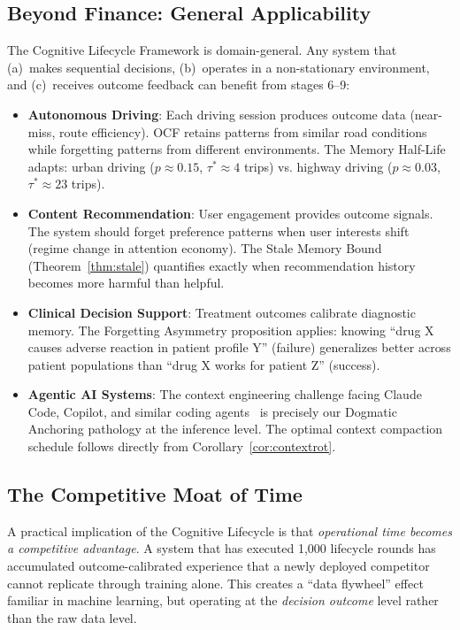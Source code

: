 \documentclass[11pt, a4paper]{article}
\begin{document}
\subsection{Beyond Finance: General Applicability}

The Cognitive Lifecycle Framework is domain-general. Any system that (a)~makes sequential decisions, (b)~operates in a non-stationary environment, and (c)~receives outcome feedback can benefit from stages 6--9:

\begin{itemize}
  \item \textbf{Autonomous Driving}: Each driving session produces outcome data (near-miss, route efficiency). OCF retains patterns from similar road conditions while forgetting patterns from different environments. The Memory Half-Life adapts: urban driving ($p \approx 0.15$, $\tau^* \approx 4$ trips) vs. highway driving ($p \approx 0.03$, $\tau^* \approx 23$ trips).
  
  \item \textbf{Content Recommendation}: User engagement provides outcome signals. The system should forget preference patterns when user interests shift (regime change in attention economy). The Stale Memory Bound (Theorem~\ref{thm:stale}) quantifies exactly when recommendation history becomes more harmful than helpful.
  
  \item \textbf{Clinical Decision Support}: Treatment outcomes calibrate diagnostic memory. The Forgetting Asymmetry proposition applies: knowing ``drug X causes adverse reaction in patient profile Y'' (failure) generalizes better across patient populations than ``drug X works for patient Z'' (success).
  
  \item \textbf{Agentic AI Systems}: The context engineering challenge facing Claude Code, Copilot, and similar coding agents~\cite{anthropic2025context} is precisely our Dogmatic Anchoring pathology at the inference level. The optimal context compaction schedule follows directly from Corollary~\ref{cor:contextrot}.
\end{itemize}

\subsection{The Competitive Moat of Time}

A practical implication of the Cognitive Lifecycle is that \emph{operational time becomes a competitive advantage}. A system that has executed 1,000 lifecycle rounds has accumulated outcome-calibrated experience that a newly deployed competitor cannot replicate through training alone. This creates a ``data flywheel'' effect familiar in machine learning, but operating at the \emph{decision outcome} level rather than the raw data level.
\end{document}
